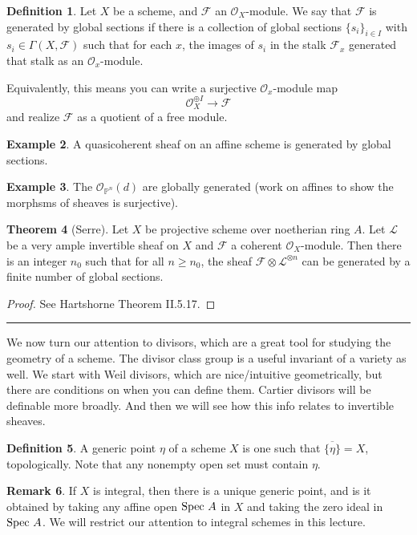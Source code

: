 \documentclass[10pt,reqno]{amsart}
\theoremstyle{definition}
\newtheorem{theorem}{Theorem}
\newtheorem{example}[theorem]{Example}
\newtheorem{definition}[theorem]{Definition}
\newtheorem{remark}[theorem]{Remark}
\theoremstyle{remark}
\numberwithin{equation}{section}
\numberwithin{theorem}{section}
\newcommand{\OO}{{\mathcal O}}
\newcommand{\spec}{\textup{Spec }}
\newcommand{\FF}{{\mathscr F}}
\newcommand{\LL}{{\mathscr L}}
\newcommand{\PP}{{\mathbb P}}
\begin{document}
\begin{definition} Let $X$ be a scheme, and $\FF$ an $\OO_X$-module. We say that $\FF$ is generated by global sections if there is a collection of global sections $\{s_i\}_{i \in I}$ with $s_i \in \Gamma(X,\FF)$ such that for each $x$, the images of $s_i$ in the stalk $\FF_x$ generated that stalk as an $\OO_x$-module.

Equivalently, this means you can write a surjective $\OO_x$-module map
\[\OO_X^{\oplus I}  \to \FF\]
and realize $\FF$ as a quotient of a free module.
\end{definition}

\begin{example} A quasicoherent sheaf on an affine scheme is generated by global sections.
\end{example}

\begin{example}
The $\OO_{\PP^n}(d)$ are globally generated (work on affines to show the morphsms of sheaves is surjective).
\end{example}

\begin{theorem}[Serre]\label{theorem:serre-finitely-generated} Let $X$ be projective scheme over noetherian ring $A$. Let $\LL$ be a very ample invertible sheaf on $X$ and $\FF$ a coherent $\OO_X$-module. Then there is an integer $n_0$ such that for all $n \ge n_0$, the sheaf $\FF \otimes \LL^{\otimes n}$ can be generated by a finite number of global sections.
\end{theorem}
\begin{proof} See Hartshorne Theorem II.5.17.
\end{proof}
\hrule
\vspace{1em}

We now turn our attention to divisors, which are a great tool for studying the geometry of a scheme. The divisor class group is a useful invariant of a variety as well. We start with Weil divisors, which are nice/intuitive geometrically, but there are conditions on when you can define them. Cartier divisors will be definable more broadly. And then we will see how this info relates to invertible sheaves.


\begin{definition} A generic point $\eta$ of a scheme $X$ is one such that $\overline{\{\eta\}} = X$, topologically. Note that any nonempty open set must contain $\eta$.
\end{definition}

\begin{remark} If $X$ is integral, then there is a unique generic point, and is it obtained by taking any affine open $\spec A$ in $X$ and taking the zero ideal in $\spec A$. We will restrict our attention to integral schemes in this lecture.
\end{remark}
\end{document}
